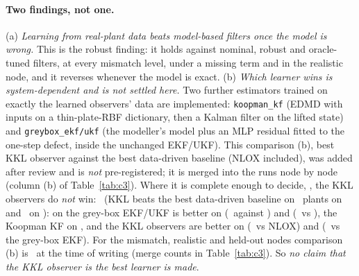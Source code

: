 \paragraph{Two findings, not one.} (a) \emph{Learning from real-plant data beats model-based filters once the model is wrong.} This is the robust finding: it holds against nominal, robust and oracle-tuned filters, at every mismatch level, under a missing term and in the realistic node, and it reverses whenever the model is exact. (b) \emph{Which learner wins is system-dependent and is not settled here.} Two further estimators trained on exactly the learned observers' data are implemented: \texttt{koopman\_kf} (EDMD with inputs on a thin-plate-RBF dictionary, then a Kalman filter on the lifted state) and \texttt{greybox\_ekf/ukf} (the modeller's model plus an MLP residual fitted to the one-step defect, inside the unchanged EKF/UKF). This comparison (b), best KKL observer against the best data-driven baseline (NLOX included), was added after review and is \emph{not} pre-registered; it is merged into the runs node by node (column (b) of Table~\ref{tab:c3}). Where it is complete enough to decide, , the KKL observers do \emph{not} win: \OutcomeCThreePartialDataDriven\ (KKL beats the best data-driven baseline on \CthreePartialIdVsDataDriven\ plants on  and \CthreePartialSeqVsDataDriven\ on ): on  the grey-box EKF/UKF is better on  (\CthreePartialSeqBatteryBestDataDriven\ against \CthreePartialSeqBatteryBestLearned) and  (\CthreePartialSeqDuffingBestDataDriven\ vs \CthreePartialSeqDuffingBestLearned), the Koopman KF on , and the KKL observers are better on  (\CthreePartialSeqLorenzVsDataDriven\ vs NLOX) and  (\CthreePartialSeqVdpVsDataDriven\ vs the grey-box EKF). For the mismatch, realistic and held-out nodes comparison (b) is \OutcomeCThreeRealisticDataDriven\ at the time of writing (merge counts in Table~\ref{tab:c3}). So \emph{no claim that the KKL observer is the best learner is made}.
